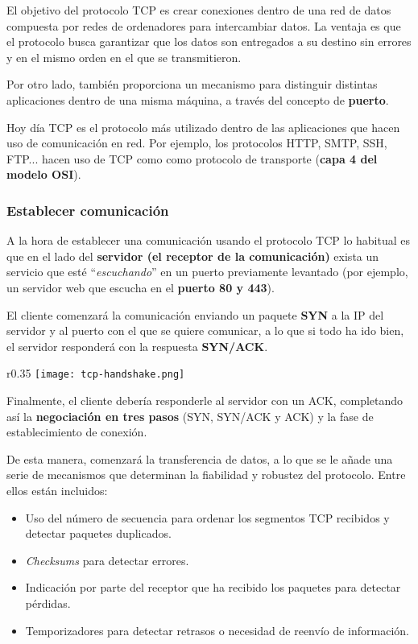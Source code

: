 El objetivo del protocolo TCP es crear conexiones dentro de una red de datos compuesta por redes de ordenadores para intercambiar datos. La ventaja es que el protocolo busca garantizar que los datos son entregados a su destino sin errores y en el mismo orden en el que se transmitieron.

Por otro lado, también proporciona un mecanismo para distinguir distintas aplicaciones dentro de una misma máquina, a través del concepto de \textbf{puerto}.

Hoy día TCP es el protocolo más utilizado dentro de las aplicaciones que hacen uso de comunicación en red. Por ejemplo, los protocolos HTTP, SMTP, SSH, FTP... hacen uso de TCP como como protocolo de transporte (\textbf{capa 4 del modelo OSI}).


\subsubsection{Establecer comunicación}
A la hora de establecer una comunicación usando el protocolo TCP lo habitual es que en el lado del \textbf{servidor (el receptor de la comunicación)} exista un servicio que esté “\textit{escuchando}” en un puerto previamente levantado (por ejemplo, un servidor web que escucha en el \textbf{puerto 80 y 443}).

El cliente comenzará la comunicación enviando un paquete \textbf{SYN} a la IP del servidor y al puerto con el que se quiere comunicar, a lo que si todo ha ido bien, el servidor responderá con la respuesta \textbf{SYN/ACK}.
\begin{wrapfigure}{r}{0.35\linewidth}
    \hfill
    \vspace{-30pt}
    \texttt{[image: tcp-handshake.png]}
    \vspace{-10pt}
\end{wrapfigure}

Finalmente, el cliente debería responderle al servidor con un ACK, completando así la \textbf{negociación en tres pasos} (SYN, SYN/ACK y ACK) y la fase de establecimiento de conexión.

De esta manera, comenzará la transferencia de datos, a lo que se le añade una serie de mecanismos que determinan la fiabilidad y robustez del protocolo. Entre ellos están incluidos:


\begin{itemize}
    \item Uso del número de secuencia para ordenar los segmentos TCP recibidos y detectar paquetes duplicados.
    \item \textit{Checksums} para detectar errores.
    \item Indicación por parte del receptor que ha recibido los paquetes para detectar pérdidas.
    \item Temporizadores para detectar retrasos o necesidad de reenvío de información.
\end{itemize}


